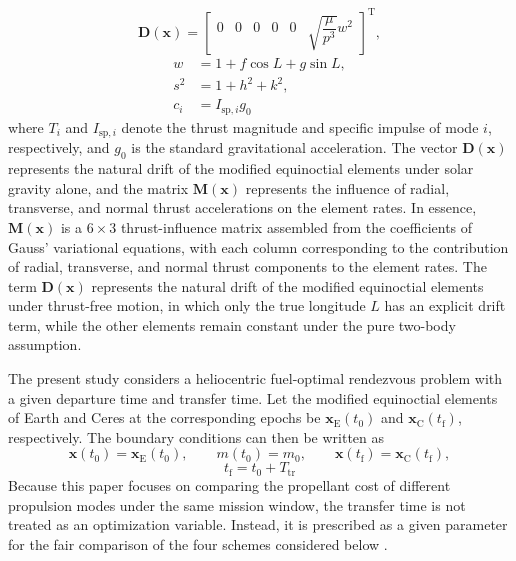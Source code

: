 ﻿\documentclass{IEEEtaes}
\begin{document}
\begin{equation}
\bm{D}(\bm{x})=\begin{bmatrix}0&0&0&0&0&\sqrt{\dfrac{\mu}{p^3}}w^2\end{bmatrix}^{\mathrm{T}},
\end{equation}
\begin{equation}
\begin{aligned}
w&=1+f\cos L+g\sin L,\\
s^2&=1+h^2+k^2,\\
c_i&=I_{\mathrm{sp},i}g_0
\end{aligned}
\end{equation}
where $T_i$ and $I_{\mathrm{sp},i}$ denote the thrust magnitude and specific impulse of mode $i$, respectively, and $g_0$ is the standard gravitational acceleration. The vector $\bm{D}(\bm{x})$ represents the natural drift of the modified equinoctial elements under solar gravity alone, and the matrix $\bm{M}(\bm{x})$ represents the influence of radial, transverse, and normal thrust accelerations on the element rates. In essence, $\bm{M}(\bm{x})$ is a $6\times3$ thrust-influence matrix assembled from the coefficients of Gauss' variational equations, with each column corresponding to the contribution of radial, transverse, and normal thrust components to the element rates. The term $\bm{D}(\bm{x})$ represents the natural drift of the modified equinoctial elements under thrust-free motion, in which only the true longitude $L$ has an explicit drift term, while the other elements remain constant under the pure two-body assumption.

The present study considers a heliocentric fuel-optimal rendezvous problem with a given departure time and transfer time. Let the modified equinoctial elements of Earth and Ceres at the corresponding epochs be $\bm{x}_{\mathrm{E}}(t_0)$ and $\bm{x}_{\mathrm{C}}(t_{\mathrm{f}})$, respectively. The boundary conditions can then be written as
\begin{equation}
\bm{x}(t_0)=\bm{x}_{\mathrm{E}}(t_0),\qquad m(t_0)=m_0,\qquad \bm{x}(t_{\mathrm{f}})=\bm{x}_{\mathrm{C}}(t_{\mathrm{f}}),
\end{equation}
\begin{equation}
t_{\mathrm{f}}=t_0+T_{\mathrm{tr}}
\end{equation}
Because this paper focuses on comparing the propellant cost of different propulsion modes under the same mission window, the transfer time is not treated as an optimization variable. Instead, it is prescribed as a given parameter for the fair comparison of the four schemes considered below \cite{chi2022,cline2024a}.
\end{document}
